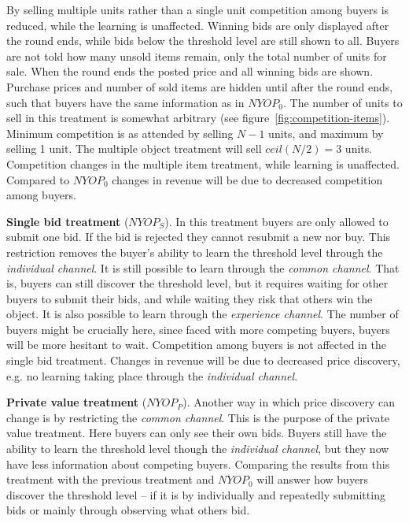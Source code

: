 \documentclass[a4paper,12pt]{article}
\begin{document}
	By selling multiple units rather than a single unit competition among buyers is reduced, while the learning is unaffected. Winning bids are only displayed after the round ends, while bids below the threshold level are still shown to all. Buyers are not told how many unsold items remain, only the total number of units for sale. When the round ends the posted price and all winning bids are shown. Purchase prices and number of sold items are hidden until after the round ends, such that buyers have the same information as in $NYOP_0$. The number of units to sell in this treatment is somewhat arbitrary (see figure~\ref{fig:competition-items}). Minimum competition is as attended by selling $N-1$ units, and maximum by selling 1 unit. The multiple object treatment will sell $ceil(N/2)=3$ units. Competition changes in the multiple item treatment, while learning is unaffected. Compared to $NYOP_0$ changes in revenue will be due to decreased competition among buyers.

	{\bf Single bid treatment} ($NYOP_S$).
	In this treatment buyers are only allowed to submit one bid. If the bid is rejected they cannot resubmit a new nor buy. This restriction removes the buyer's ability to learn the threshold level through the \emph{individual channel}. It is still possible to learn through the \emph{common channel}. That is, buyers can still discover the threshold level, but it requires waiting for other buyers to submit their bids, and while waiting they risk that others win the object. It is also possible to learn through the \emph{experience channel}. The number of buyers might be crucially here, since faced with more competing buyers, buyers will be more hesitant to wait. Competition among buyers is not affected in the single bid treatment. Changes in revenue will be due to decreased price discovery, e.g. no learning taking place through the \emph{individual channel}.

	{\bf Private value treatment} ($NYOP_P$).
	Another way in which price discovery can change is by restricting the \emph{common channel}. This is the purpose of the private value treatment. Here buyers can only see their own bids. Buyers still have the ability to learn the threshold level though the \emph{individual channel}, but they now have less information about competing buyers. Comparing the results from this treatment with the previous treatment and $NYOP_0$ will answer how buyers discover the threshold level -- if it is by individually and repeatedly submitting bids or mainly through observing what others bid. 
	
\end{document}
